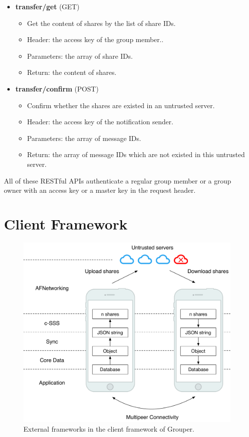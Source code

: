 \documentclass[a4paper,11pt]{report}
\begin{document}
\begin{itemize}[leftmargin=7mm]
\begin{itemize}
	\end{itemize}
	\item 
	\textbf{transfer/get} (GET)
	\begin{itemize}
		\item Get the content of shares by the list of share IDs.
		\item Header: the access key of the group member..
		\item Parameters: the array of share IDs.
		\item Return: the content of shares.
	\end{itemize}
	\item 
	\textbf{transfer/confirm} (POST)
	\begin{itemize}
		\item Confirm whether the shares are existed in an untrusted server. 
		\item Header: the access key of the notification sender.
		\item Parameters: the array of message IDs.
		\item Return: the array of message IDs which are not existed in this untrusted server.
	\end{itemize}
\end{itemize}

All of these RESTful APIs authenticate a regular group member or a group owner with an access key or a master key in the request header.

\section{Client Framework} \label{section:client_framework}

\begin{figure}
	\centering
	\includegraphics[scale=0.53]{frameworks}
	\caption{External frameworks in the client framework of Grouper.}
	\label{fig:frameworks}
\end{figure}
\end{document}
